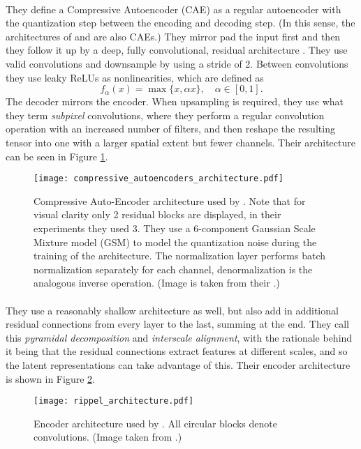 \paragraph{\cite{theis2017lossy}} They define a Compressive Autoencoder (CAE) as a regular
autoencoder with the quantization step between the encoding and decoding step.
(In this sense, the architectures of \cite{balle2016end} and
\cite{balle2018variational} are also CAEs.) They mirror pad the input first
and then they follow it up by a deep, fully convolutional, residual
architecture \cite{he2016deep}. They use valid convolutions and downsample by
using a stride of 2. Between convolutions they use leaky ReLUs as
nonlinearities, which are defined as 
\[
  f_\alpha(x) = \max\{x, \alpha x\}, \quad \alpha \in [0, 1].
\]
The decoder mirrors the encoder. When upsampling is required, they use what
they term \textit{subpixel} convolutions, where they perform a regular
convolution operation with an increased number of filters, and then reshape
the resulting tensor into one with a larger spatial extent but fewer channels.
Their architecture can be seen in Figure \ref{fig:comp_auto_arch}.
\begin{figure}
  \centering 
  \texttt{[image: compressive\_autoencoders\_architecture.pdf]}
  \caption[Compressive Auto-Encoder architecture used by \cite{theis2017lossy}.]
  {Compressive Auto-Encoder architecture used by \cite{theis2017lossy}.
    Note that for visual clarity only 2 residual blocks are displayed,
    in their experiments they used 3. They use a 6-component Gaussian Scale
    Mixture model (GSM) to model the quantization noise during the training of
    the architecture. The normalization layer performs batch normalization
    separately for each channel, denormalization is the analogous inverse
    operation. (Image is taken from their \cite{theis2017lossy}.)}
  \label{fig:comp_auto_arch}
\end{figure}

\paragraph{\cite{rippel2017real}} They use a reasonably shallow architecture as well,
but also add in additional residual connections from every layer to the last,
summing at the end. They call this
\textit{pyramidal decomposition} and \textit{interscale alignment}, with the
rationale behind it being that the residual connections extract features at
different scales, and so the latent representations can take advantage of this.
Their encoder architecture is shown in Figure \ref{fig:rippel_arch}.
\begin{figure}
  \centering 
  \texttt{[image: rippel\_architecture.pdf]}
  \caption[Encoder architecture used by \cite{rippel2017real}.]
  {Encoder architecture used by \cite{rippel2017real}. All circular blocks
    denote convolutions. (Image taken from \cite{rippel2017real}.)}
  \label{fig:rippel_arch}
\end{figure}
